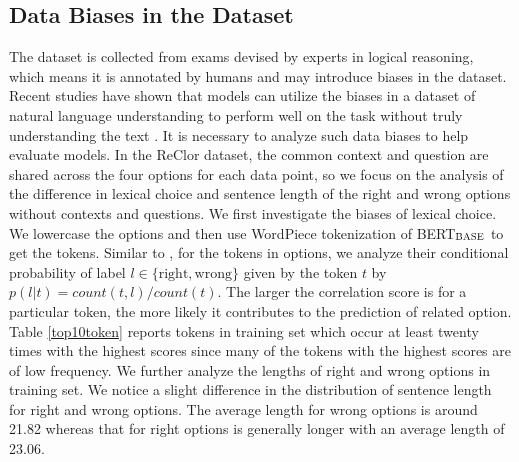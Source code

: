 \documentclass{article} \usepackage{iclr2020_conference,times}
\newcommand\bertbase{BERT$_{\small \textsc{BASE}}$\xspace}
\begin{document}
\subsection{Data Biases in the Dataset}
	
The dataset is collected from exams devised by experts in logical reasoning, which means it is annotated by humans and may introduce biases in the dataset. Recent studies have shown that models can utilize the biases in a dataset of natural language understanding to perform well on the task without truly understanding the text \citep{schwartz2017story, cai2017pay, bugert2017lsdsem, poliak2018hypothesis, gururangan2018annotation, zellers2019hellaswag}. It is necessary to analyze such data biases to help evaluate models. In the ReClor dataset, the common context and question are shared across the four options for each data point, so we focus on the analysis of the difference in lexical choice and sentence length of the right and wrong options without contexts and questions.
We first investigate the biases of lexical choice. We lowercase the options and then use WordPiece tokenization \citep{wu2016google} of \bertbase \citep{devlin2019bert} to get the tokens.
Similar to \citet{poliak2018hypothesis}, for the tokens in options, we analyze their conditional probability of label $l \in \{\mathrm{right, wrong}\}$ given by the token $t$ by $p(l|t) =count(t, l) / count(t)$. The larger the correlation score is for a particular token, the more likely it contributes to the prediction of related option. Table \ref{top10token} reports tokens in training set which occur at least twenty times with the highest scores since many of the tokens with the highest scores are of low frequency. We further analyze the lengths of right and wrong options \citep{gururangan2018annotation} in training set. 
We notice a slight difference in the distribution of sentence length for right and wrong options. The average length for wrong options is around 21.82 whereas that for right options is generally longer with an average length of 23.06. 
	
\end{document}
